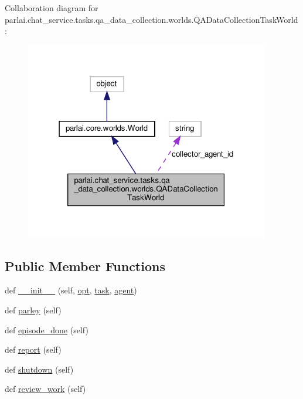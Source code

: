 Collaboration diagram for parlai.\+chat\+\_\+service.\+tasks.\+qa\+\_\+data\+\_\+collection.\+worlds.\+Q\+A\+Data\+Collection\+Task\+World\+:
\nopagebreak
\begin{figure}[H]
\begin{center}
\leavevmode
\includegraphics[width=303pt]{classparlai_1_1chat__service_1_1tasks_1_1qa__data__collection_1_1worlds_1_1QADataCollectionTaskWorld__coll__graph}
\end{center}
\end{figure}
\subsection*{Public Member Functions}
\begin{DoxyCompactItemize}
\item 
def \hyperlink{classparlai_1_1chat__service_1_1tasks_1_1qa__data__collection_1_1worlds_1_1QADataCollectionTaskWorld_ab84f1948bc80ae0de93567ea3e4488f2}{\+\_\+\+\_\+init\+\_\+\+\_\+} (self, \hyperlink{classparlai_1_1core_1_1worlds_1_1World_a3640d92718acd3e6942a28c1ab3678bd}{opt}, \hyperlink{classparlai_1_1chat__service_1_1tasks_1_1qa__data__collection_1_1worlds_1_1QADataCollectionTaskWorld_a2299f4d3d23e9d08be9430814aad9472}{task}, \hyperlink{classparlai_1_1chat__service_1_1tasks_1_1qa__data__collection_1_1worlds_1_1QADataCollectionTaskWorld_a2070bf88d1309e9f11d402ae58ae58cb}{agent})
\item 
def \hyperlink{classparlai_1_1chat__service_1_1tasks_1_1qa__data__collection_1_1worlds_1_1QADataCollectionTaskWorld_a2732be86dc4eba1255f5c27414f345d3}{parley} (self)
\item 
def \hyperlink{classparlai_1_1chat__service_1_1tasks_1_1qa__data__collection_1_1worlds_1_1QADataCollectionTaskWorld_aedbef1585d18e42ebed879e90cfc56a1}{episode\+\_\+done} (self)
\item 
def \hyperlink{classparlai_1_1chat__service_1_1tasks_1_1qa__data__collection_1_1worlds_1_1QADataCollectionTaskWorld_ab755c8e5982a600d176532d06fe50f3b}{report} (self)
\item 
def \hyperlink{classparlai_1_1chat__service_1_1tasks_1_1qa__data__collection_1_1worlds_1_1QADataCollectionTaskWorld_ac7f73536d3af94b755380148a9326a81}{shutdown} (self)
\item 
def \hyperlink{classparlai_1_1chat__service_1_1tasks_1_1qa__data__collection_1_1worlds_1_1QADataCollectionTaskWorld_af9036c044a97aeab846fbebad1c926ba}{review\+\_\+work} (self)
\end{DoxyCompactItemize}
